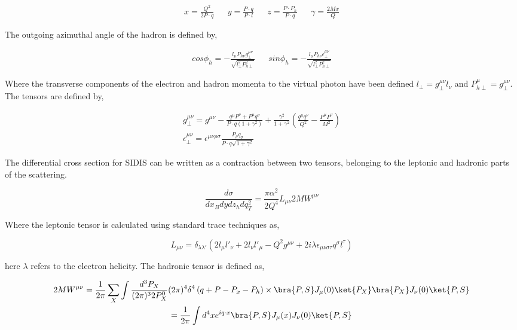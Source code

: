 \begin{align}
  x = \frac{Q^{2}}{2P \cdot q} && y = \frac{P \cdot q}{P \cdot l} && z = \frac{P \cdot P_{h}}{P \cdot q} && \gamma = \frac{2Mx}{Q}
\end{align}

The outgoing azimuthal angle of the hadron is defined by,

\begin{align}
  cos\phi_h = -\frac{l_\mu P_{h\nu} g^{\mu \nu}_{\perp}}{\sqrt{l^{2}_{\perp} P^{2}_{h\perp}}} &&
  sin\phi_h = -\frac{l_\mu P_{h\nu} \epsilon^{\mu \nu}_{\perp}}{\sqrt{l^{2}_{\perp} P^{2}_{h\perp}}} 
\end{align}

Where the transverse components of the electron and hadron momenta to the virtual photon have been defined $l_{\perp} = g^{\mu \nu}_{\perp} l_{\nu}$ and $P^{\mu}_{h\perp} = g^{\mu \nu}_{\perp}$.  The tensors are defined by,

\begin{gather}
  g^{\mu \nu}_{\perp} = g^{\mu \nu} - \frac{q^\mu P^\nu + P^\mu q^\nu}{P \cdot q (1 + \gamma^2)} + \frac{\gamma^{2}}{1 + \gamma^2} \left( \frac{q^\mu q^\nu}{Q^2} - \frac{P^\mu P^\nu}{M^2}\right) \\
  \epsilon^{\mu \nu}_{\perp} = \epsilon^{\mu \nu \rho \sigma} \frac{P_\rho q_\sigma}{P \cdot q \sqrt{1 + \gamma^2}}
\end{gather}
 
The differential cross section for SIDIS can be written as a contraction between two tensors, belonging to the leptonic and hadronic parts of the scattering.

\begin{equation}
  \frac{d\sigma}{dx_{B} dy dz_{h} dq_{T}^{2}} = \frac{\pi \alpha^{2}}{2 Q^{4}} L_{\mu \nu} 2M W^{\mu \nu}
\end{equation}

Where the leptonic tensor is calculated using standard trace techniques as,

\begin{equation}
  L_{\mu \nu} = \delta_{\lambda \lambda'} \left( 2 l_{\mu} l'_{\nu} + 2 l_{\nu} l'_{\mu} - Q^{2} g^{\mu \nu} + 2i\lambda \epsilon_{\mu \nu \sigma \tau} q^{\sigma} l^{\tau} \right) 
\end{equation}

here $\lambda$ refers to the electron helicity. The hadronic tensor is defined as,

\begin{gather}
  2MW^{\mu \nu} = \frac{1}{2\pi} \sum_{X} \int \frac{d^{3}P_{X}}{(2\pi)^{3}2P^{0}_{X}} (2\pi)^{4} \delta^{4} \left( q + P - P_{x} - P_{h} \right) \times
  \bra{P,S} J_{\mu}(0) \ket{P_{X}} \bra{P_{X}} J_{\nu}(0) \ket{P,S} \nonumber \\
  = \frac{1}{2\pi} \int d^{4}x e^{iq\cdot x} \bra{P,S} J_{\mu}(x) J_{\nu}(0) \ket{P,S}
  \label{eqn:hadronictensor}
\end{gather}

